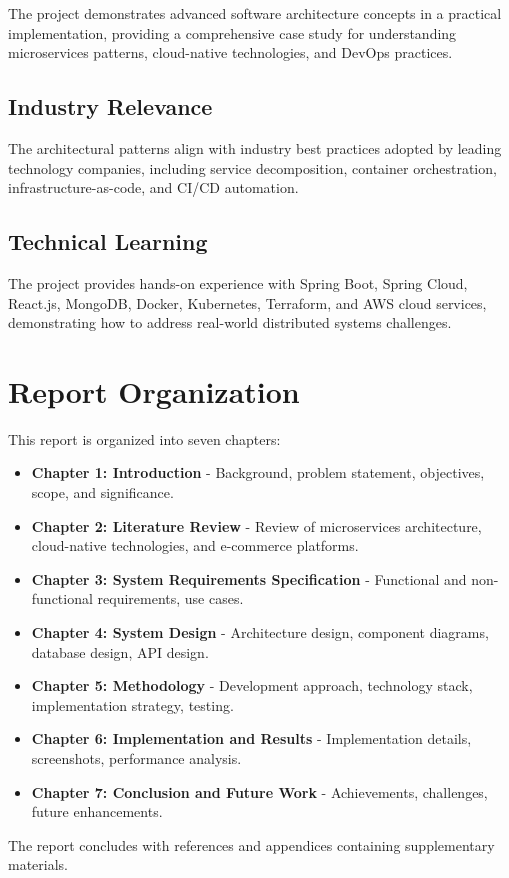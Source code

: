 The project demonstrates advanced software architecture concepts in a practical implementation, providing a comprehensive case study for understanding microservices patterns, cloud-native technologies, and DevOps practices.

\subsection{Industry Relevance}

The architectural patterns align with industry best practices adopted by leading technology companies, including service decomposition, container orchestration, infrastructure-as-code, and CI/CD automation.

\subsection{Technical Learning}

The project provides hands-on experience with Spring Boot, Spring Cloud, React.js, MongoDB, Docker, Kubernetes, Terraform, and AWS cloud services, demonstrating how to address real-world distributed systems challenges.

\section{Report Organization}

This report is organized into seven chapters:

\begin{itemize}
    \item \textbf{Chapter 1: Introduction} - Background, problem statement, objectives, scope, and significance.
    
    \item \textbf{Chapter 2: Literature Review} - Review of microservices architecture, cloud-native technologies, and e-commerce platforms.
    
    \item \textbf{Chapter 3: System Requirements Specification} - Functional and non-functional requirements, use cases.
    
    \item \textbf{Chapter 4: System Design} - Architecture design, component diagrams, database design, API design.
    
    \item \textbf{Chapter 5: Methodology} - Development approach, technology stack, implementation strategy, testing.
    
    \item \textbf{Chapter 6: Implementation and Results} - Implementation details, screenshots, performance analysis.
    
    \item \textbf{Chapter 7: Conclusion and Future Work} - Achievements, challenges, future enhancements.
\end{itemize}

The report concludes with references and appendices containing supplementary materials.
